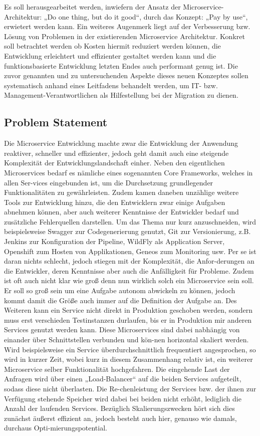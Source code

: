 \documentclass[11pt]{article}
\begin{document}
Es soll herausgearbeitet werden, inwiefern der Ansatz der Microservice-Architektur: „Do one thing, but do it good“, durch das Konzept: „Pay by use“, erwietert werden kann. Ein weiteres Augenmerk liegt auf der Verbesserung bzw. Lösung von Problemen in der existierenden Microservice Architektur. Konkret soll betrachtet werden ob Kosten hiermit reduziert werden können, die Entwicklung erleichtert und effizienter gestaltet werden kann und die funktionsbasierte Entwicklung letzten Endes auch performant genug ist. 
Die zuvor genannten und zu untersuchenden Aspekte dieses neuen Konzeptes sollen systematisch anhand eines Leitfadens behandelt werden, um IT- bzw. Management-Verantwortlichen als Hilfestellung bei der Migration zu dienen. 
\subsection{Problem Statement}
Die Microservice Entwicklung machte zwar die Entwicklung der Anwendung reaktiver, schneller und effizienter, jedoch geht damit auch eine steigende Komplexität der Entwicklungslandschaft einher. Neben den eigentlichen Microservices bedarf es nämliche eines sogenannten Core Frameworks, welches in allen Ser-vices eingebunden ist, um die Durchsetzung grundlegender Funktionalitäten zu gewährleisten. Zudem kamen daneben unzählige weitere Tools zur Entwicklung hinzu, die den Entwicklern zwar einige Aufgaben abnehmen können, aber auch weiterer Kenntnisse der Entwickler bedarf und zusätzliche Fehlerquellen darstellen. Um das Thema nur kurz anzuschneiden, wird beispielsweise Swagger zur Codegenerierung genutzt, Git zur Versionierung, z.B. Jenkins zur Konfiguration der Pipeline, WildFly als Application Server, Openshift zum Hosten von Applikationen, Geneos zum Monitoring usw. Per se ist daran nichts schlecht, jedoch stiegen mit der Komplexität, die Anfor-derungen an die Entwickler, deren Kenntnisse aber auch die Anfälligkeit für Probleme. 
Zudem ist oft auch nicht klar wie groß denn nun wirklich solch ein Microservice sein soll. Er soll so groß sein um eine Aufgabe autonom abwickeln zu können, jedoch kommt damit die Größe auch immer auf die Definition der Aufgabe an. Des Weiteren kann ein Service nicht direkt in Produktion geschoben werden, sondern muss erst verschieden Testinstanzen durlaufen, bis er in Produktion mir anderen Services genutzt werden kann.
Diese Microservices sind dabei nabhängig von einander über Schnittstellen verbunden und kön-nen horizontal skaliert werden. Wird beispielsweise ein Service überdurchschnittlich frequentiert angesprochen, so wird in kurzer Zeit, wobei kurz in diesem Zusammenhang relativ ist, ein weiterer Microservice selber Funktionalität hochgefahren. Die eingehende Last der Anfragen wird über einen „Load-Balancer“ auf die beiden Services aufgeteilt, sodass diese nicht überlasten. Die Re-chenleistung der Services bzw. der ihnen zur Verfügung stehende Speicher wird dabei bei beiden nicht erhöht, lediglich die Anzahl der laufenden Services. Bezüglich Skalierungszwecken hört sich dies zunächst äußerst effizient an, jedoch besteht auch hier, genauso wie damals, durchaus Opti-mierungspotential.
\end{document}
